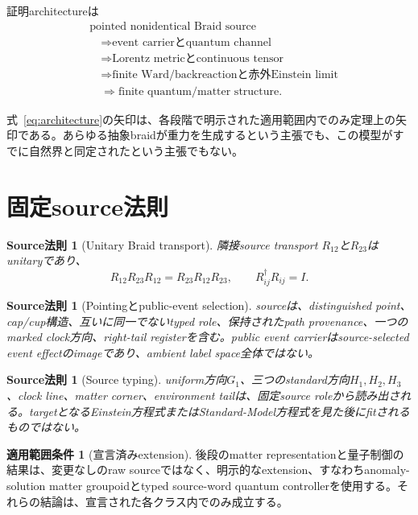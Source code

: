 \documentclass[11pt]{article}
\newtheorem{law}[theorem]{Source法則}
\theoremstyle{definition}
\newtheorem{scope}[theorem]{適用範囲条件}
\theoremstyle{remark}
\begin{document}
証明architectureは
\begin{equation}
\begin{aligned}
&\text{pointed nonidentical Braid source}\\
&\quad\Longrightarrow\text{event carrierとquantum channel}\\
&\quad\Longrightarrow\text{Lorentz metricとcontinuous tensor}\\
&\quad\Longrightarrow\text{finite Ward/backreactionと赤外Einstein limit}\\
&\quad\Longrightarrow\text{finite quantum/matter structure}.
\end{aligned}
\label{eq:architecture}
\end{equation}

式~\eqref{eq:architecture}の矢印は、各段階で明示された適用範囲内でのみ定理上の矢印である。あらゆる抽象braidが重力を生成するという主張でも、この模型がすでに自然界と同定されたという主張でもない。

\section{固定source法則}

\begin{law}[Unitary Braid transport]
隣接source transport $R_{12}$と$R_{23}$はunitaryであり、
\begin{equation}
R_{12}R_{23}R_{12}=R_{23}R_{12}R_{23},
\qquad R_{ij}^{\dagger}R_{ij}=I.
\label{eq:ybe}
\end{equation}
\end{law}

\begin{law}[Pointingとpublic-event selection]
sourceは、distinguished point、cap/cup構造、互いに同一でないtyped role、保持されたpath provenance、一つのmarked clock方向、right-tail registerを含む。public event carrierはsource-selected event effectのimageであり、ambient label space全体ではない。
\end{law}

\begin{law}[Source typing]
uniform方向$G_1$、三つのstandard方向$H_1,H_2,H_3$、clock line、matter corner、environment tailは、固定source roleから読み出される。targetとなるEinstein方程式またはStandard-Model方程式を見た後にfitされるものではない。
\end{law}

\begin{scope}[宣言済みextension]
後段のmatter representationと量子制御の結果は、変更なしのraw sourceではなく、明示的なextension、すなわちanomaly-solution matter groupoidとtyped source-word quantum controllerを使用する。それらの結論は、宣言された各クラス内でのみ成立する。
\end{scope}
\end{document}
